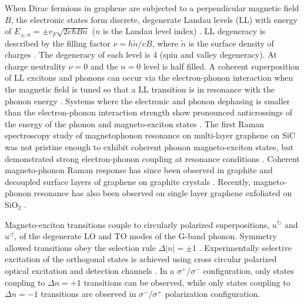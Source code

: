 \documentclass[prl,aps,superscriptaddress,showpacs,reprint]{revtex4-1}
\begin{document}
When Dirac fermions in graphene are subjected to a perpendicular magnetic field $B$, the electronic states form discrete, degenerate Landau levels (LL) with energy of $E_{\pm, n}=\pm v_F\sqrt{2e\hbar Bn}$ ($n$ is the Landau level index) \cite{neto2009electronic,goerbig2011electronic}. LL degeneracy is described by  the filling factor $\nu = h\widetilde{n}/eB$, where $\widetilde{n}$ is the surface density of charges \cite{goerbig2007filling}.
The degeneracy of each level is 4 (spin and valley degeneracy). At charge neutrality $\nu = 0$ and the $n=0$ level is half filled. A coherent superposition of LL excitons and phonons can occur via the electron-phonon interaction when the magnetic field is tuned so that a LL transition is in resonance with the phonon energy \cite{ando2007magnetic,goerbig2007filling,goerbig2011electronic}. Systems where the electronic and phonon dephasing is smaller than the electron-phonon interaction strength show pronounced anticrossings of the energy of the phonon and magneto-exciton states \cite{ando2007magnetic,goerbig2007filling,goerbig2011electronic}. The first Raman spectroscopy study of magnetophonon resonance on multi-layer graphene on SiC was not pristine enough to exhibit coherent phonon magneto-exciton states, but demonstrated strong electron-phonon coupling at resonance conditions \cite{faugeras2009tuning}. Coherent magneto-phonon Raman response has since been observed in graphite \cite{PhysRevB.84.235138,kim2012magnetophonon,yan2010observation} and decoupled surface layers of graphene on graphite crystals \cite{kuhne2012polarization,faugeras2011magneto,yan2010observation}. Recently, magneto-phonon resonance has also been observed on single layer graphene exfoliated on SiO$_2$ \cite{PhysRevLett.110.227402,kossacki2012circular}.

Magneto-exciton transitions couple to circularly polarized superpositions, $u^{\circlearrowright}$ and $u^{\circlearrowleft}$, of the degenerate LO and TO modes of the G-band phonon. Symmetry allowed transitions obey the selection rule $\Delta\left|n\right|=\pm 1$ \cite{PhysRevB.84.235138}. Experimentally selective excitation of the orthogonal states is achieved using cross circular polarized optical excitation and detection channels \cite{PhysRevLett.110.227402,kossacki2012circular,kuhne2012polarization}. In a $\sigma^+/\sigma^-$ configuration, only states coupling to $\Delta n=+1$ transitions can be observed, while only states coupling to $\Delta n=-1$ transitions are observed in $\sigma^-/\sigma^+$ polarization configuration.
\end{document}
